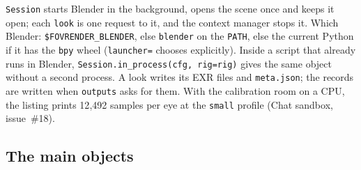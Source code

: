 \documentclass[11pt,a4paper]{article}
\newcommand{\code}[1]{\texttt{\small #1}}
\begin{document}
\code{Session} starts Blender in the background, opens the scene once and keeps it open; each \code{look} is one
request to it, and the context manager stops it. Which Blender: \code{\$FOVRENDER\_BLENDER}, else
\code{blender} on the \code{PATH}, else the current Python if it has the \code{bpy} wheel (\code{launcher=}
chooses explicitly). Inside a script that already runs in Blender, \code{Session.in\_process(cfg, rig=rig)}
gives the same object without a second process. A look writes its EXR files and \code{meta.json}; the records
are written when \code{outputs} asks for them. With the calibration room on a CPU, the listing prints 12{,}492
samples per eye at the \code{small} profile (Chat sandbox, issue~\#18).

\subsection{The main objects}\label{sec:objects}
\end{document}
